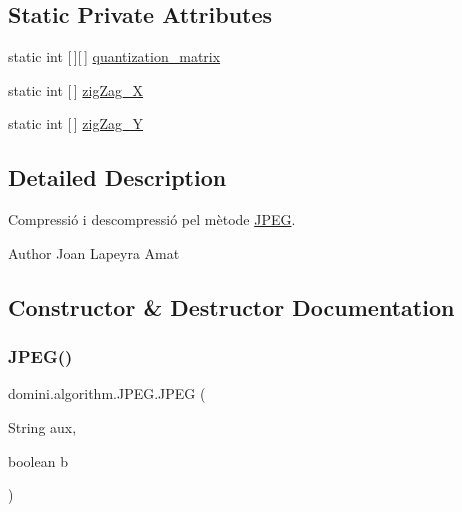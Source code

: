 \subsection*{Static Private Attributes}
\begin{DoxyCompactItemize}
\item 
static int \mbox{[}$\,$\mbox{]}\mbox{[}$\,$\mbox{]} \hyperlink{classdomini_1_1algorithm_1_1JPEG_a7c95eb140dbe185a31b402d48ec17a66}{quantization\+\_\+matrix}
\item 
static int \mbox{[}$\,$\mbox{]} \hyperlink{classdomini_1_1algorithm_1_1JPEG_a7d3829cbffd758c087341a8da13dd2ca}{zig\+Zag\+\_\+X}
\item 
static int \mbox{[}$\,$\mbox{]} \hyperlink{classdomini_1_1algorithm_1_1JPEG_ad886d8aa00a40cb151b446534f0d1bcc}{zig\+Zag\+\_\+Y}
\end{DoxyCompactItemize}


\subsection{Detailed Description}
Compressió i descompressió pel mètode \hyperlink{classdomini_1_1algorithm_1_1JPEG}{J\+P\+EG}. 

\begin{DoxyAuthor}{Author}
Joan Lapeyra Amat 
\end{DoxyAuthor}


\subsection{Constructor \& Destructor Documentation}
\mbox{\label{classdomini_1_1algorithm_1_1JPEG_a9dce5a80ccc8b626758cb4ae0b93e056}} 
\subsubsection{\texorpdfstring{J\+P\+E\+G()}{JPEG()}}
{\footnotesize\ttfamily domini.\+algorithm.\+J\+P\+E\+G.\+J\+P\+EG (\begin{DoxyParamCaption}\item[{String}]{aux,  }\item[{boolean}]{b }\end{DoxyParamCaption})\hspace{0.3cm}{\ttfamily [inline]}}




